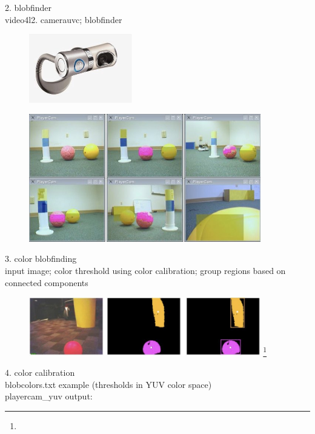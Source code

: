 2. blobfinder\\
video4l2. camerauvc; blobfinder\\

\begin{figure}[!h]
\centering
\includegraphics[width=0.4\textwidth]{figures/6_webcam.jpg}
\end{figure}

\begin{figure}[!h]
\centering
\includegraphics[width=0.9\textwidth]{figures/6_playercam.jpg}
\end{figure}

3. color blobfinding\\
input image; color threshold using color calibration; group regions based on connected components\\

\begin{figure}[!h]
\centering
\includegraphics[width=0.9\textwidth]{figures/6_blobfinding.jpg}
\footnote{}
\end{figure}

4. color calibration\\
blobcolors.txt example (thresholds in YUV color space)\\
playercam\_yuv output:\\

